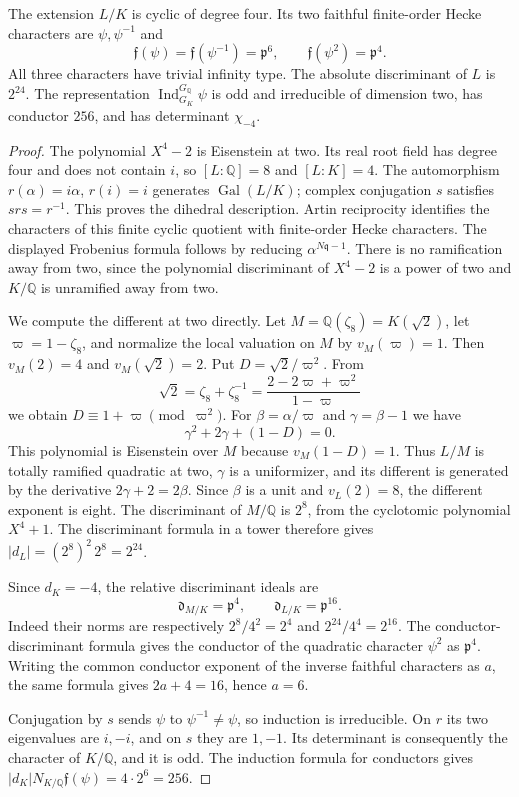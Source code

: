 \begin{proposition}\label{prop:quartic-conductor}
The extension $L/K$ is cyclic of degree four. Its two faithful finite-order
Hecke characters are $\psi,\psi^{-1}$ and
\[
 \mathfrak f(\psi)=\mathfrak f(\psi^{-1})=\mathfrak p^6,
 \qquad \mathfrak f(\psi^2)=\mathfrak p^4.
\]
All three characters have trivial infinity type. The absolute discriminant of
$L$ is $2^{24}$. The representation
$\operatorname{Ind}_{G_K}^{G_{\mathbb Q}}\psi$ is odd and irreducible of
dimension two, has conductor $256$, and has determinant $\chi_{-4}$.
\end{proposition}
\begin{proof}
The polynomial $X^4-2$ is Eisenstein at two. Its real root field has degree four
and does not contain $i$, so $[L:\mathbb Q]=8$ and $[L:K]=4$.
The automorphism $r(\alpha)=i\alpha$, $r(i)=i$ generates
$\operatorname{Gal}(L/K)$; complex conjugation $s$ satisfies $srs=r^{-1}$.
This proves the dihedral description. Artin reciprocity identifies the
characters of this finite cyclic quotient with finite-order Hecke characters.
The displayed Frobenius formula follows by reducing $\alpha^{N\mathfrak q-1}$.
There is no ramification away from two, since the polynomial discriminant
of $X^4-2$ is a power of two and $K/\mathbb Q$ is unramified away from two.

We compute the different at two directly. Let $M=\mathbb Q(\zeta_8)=K(\sqrt2)$,
let $\varpi=1-\zeta_8$, and normalize the local valuation on $M$ by
$v_M(\varpi)=1$. Then $v_M(2)=4$ and $v_M(\sqrt2)=2$.
Put $D=\sqrt2/\varpi^2$. From
\[
 \sqrt2=\zeta_8+\zeta_8^{-1}
        =\frac{2-2\varpi+\varpi^2}{1-\varpi}
\]
we obtain $D\equiv1+\varpi\pmod{\varpi^2}$. For
$\beta=\alpha/\varpi$ and $\gamma=\beta-1$ we have
\[
 \gamma^2+2\gamma+(1-D)=0.
\]
This polynomial is Eisenstein over $M$ because $v_M(1-D)=1$.
Thus $L/M$ is totally ramified quadratic at two, $\gamma$ is a uniformizer,
and its different is generated by the derivative $2\gamma+2=2\beta$.
Since $\beta$ is a unit and $v_L(2)=8$, the different exponent is eight.
The discriminant of $M/\mathbb Q$ is $2^8$, from the cyclotomic polynomial
$X^4+1$. The discriminant formula in a tower therefore gives
$|d_L|=(2^8)^2\,2^8=2^{24}$.

Since $d_K=-4$, the relative discriminant ideals are
\[
 \mathfrak d_{M/K}=\mathfrak p^4,
 \qquad \mathfrak d_{L/K}=\mathfrak p^{16}.
\]
Indeed their norms are respectively $2^8/4^2=2^4$ and
$2^{24}/4^4=2^{16}$. The conductor-discriminant formula
\cite[Chapter V, Theorem~3.27, p.~165]{MilneCFT}
gives the conductor of the quadratic character $\psi^2$ as $\mathfrak p^4$.
Writing the common conductor exponent of the inverse faithful characters as
$a$, the same formula gives $2a+4=16$, hence $a=6$.

Conjugation by $s$ sends $\psi$ to $\psi^{-1}\ne\psi$, so induction is
irreducible. On $r$ its two eigenvalues are $i,-i$, and on $s$ they are
$1,-1$. Its determinant is consequently the character of $K/\mathbb Q$,
and it is odd. The induction formula for conductors gives
$|d_K|N_{K/\mathbb Q}\mathfrak f(\psi)=4\cdot2^6=256$.
\end{proof}


